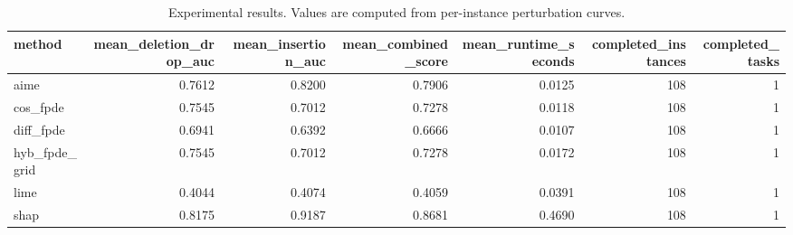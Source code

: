 \begin{table}[t]
\caption{Experimental results. Values are computed from per-instance perturbation curves.}
\label{tab:main_results_computed}
\centering
\begin{tabular}{lrrrrrr}
\toprule
method & mean\_deletion\_drop\_auc & mean\_insertion\_auc & mean\_combined\_score & mean\_runtime\_seconds & completed\_instances & completed\_tasks \\
\midrule
aime & 0.7612 & 0.8200 & 0.7906 & 0.0125 & 108 & 1 \\
cos\_fpde & 0.7545 & 0.7012 & 0.7278 & 0.0118 & 108 & 1 \\
diff\_fpde & 0.6941 & 0.6392 & 0.6666 & 0.0107 & 108 & 1 \\
hyb\_fpde\_grid & 0.7545 & 0.7012 & 0.7278 & 0.0172 & 108 & 1 \\
lime & 0.4044 & 0.4074 & 0.4059 & 0.0391 & 108 & 1 \\
shap & 0.8175 & 0.9187 & 0.8681 & 0.4690 & 108 & 1 \\
\bottomrule
\end{tabular}

\end{table}
